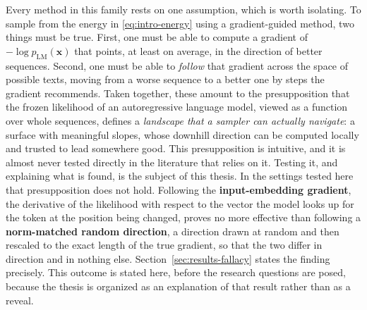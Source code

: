 Every method in this family rests on one assumption, which is worth isolating. To sample from the energy in \eqref{eq:intro-energy} using a gradient-guided method, two things must be true. First, one must be able to compute a gradient of $-\log p_{\text{LM}}(\bm{x})$ that points, at least on average, in the direction of better sequences. Second, one must be able to \emph{follow} that gradient across the space of possible texts, moving from a worse sequence to a better one by steps the gradient recommends. Taken together, these amount to the presupposition that the frozen likelihood of an autoregressive language model, viewed as a function over whole sequences, defines a \emph{landscape that a sampler can actually navigate}: a surface with meaningful slopes, whose downhill direction can be computed locally and trusted to lead somewhere good. This presupposition is intuitive, and it is almost never tested directly in the literature that relies on it. Testing it, and explaining what is found, is the subject of this thesis. In the settings tested here that presupposition does not hold. Following the \textbf{input-embedding gradient}, the derivative of the likelihood with respect to the vector the model looks up for the token at the position being changed, proves no more effective than following a \textbf{norm-matched random direction}, a direction drawn at random and then rescaled to the exact length of the true gradient, so that the two differ in direction and in nothing else. Section~\ref{sec:results-fallacy} states the finding precisely. This outcome is stated here, before the research questions are posed, because the thesis is organized as an explanation of that result rather than as a reveal.

